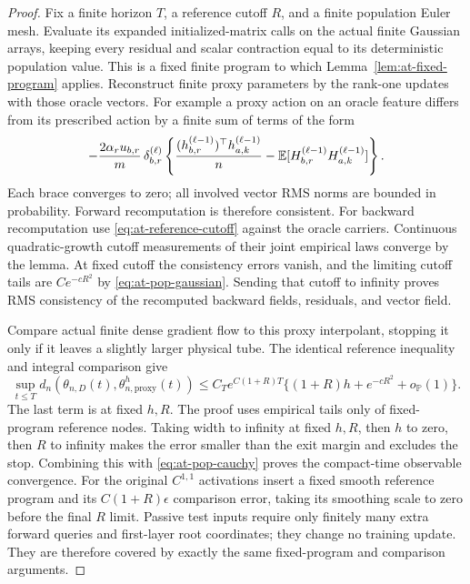 \begin{proof}
Fix a finite horizon $T$, a reference cutoff $R$, and a finite population
Euler mesh.  Evaluate its expanded initialized-matrix calls on the actual
finite Gaussian arrays, keeping every residual and scalar contraction
equal to its deterministic population value.  This is a fixed finite
program to which Lemma~\ref{lem:at-fixed-program} applies.
Reconstruct finite proxy parameters by the rank-one updates with those
oracle vectors.  For example a proxy action on an oracle feature differs
from its prescribed action by a finite sum of terms of the form
\[
 -\frac{2\alpha_ru_{b,r}}m\,\delta_{b,r}^{(\ell)}
 \left\{\frac{(h_{b,r}^{(\ell-1)})^\top h_{a,k}^{(\ell-1)}}n
              -\mathbb{E}[H_{b,r}^{(\ell-1)}H_{a,k}^{(\ell-1)}]\right\}.
\]
Each brace converges to zero; all involved vector RMS norms are bounded
in probability.  Forward recomputation is therefore consistent.
For backward recomputation use \eqref{eq:at-reference-cutoff} against
the oracle carriers.  Continuous quadratic-growth cutoff measurements
of their joint empirical laws converge by the lemma.  At fixed cutoff
the consistency errors vanish, and the limiting cutoff tails are
$Ce^{-cR^2}$ by \eqref{eq:at-pop-gaussian}.  Sending that cutoff to
infinity proves RMS consistency of the recomputed backward fields,
residuals, and vector field.

Compare actual finite dense gradient flow to this proxy interpolant,
stopping it only if it leaves a slightly larger physical tube.
The identical reference inequality and integral comparison give
\[
 \sup_{t\le T}d_n(\theta_{n,D}(t),\theta_{n,\mathrm{proxy}}^h(t))
 \le C_Te^{C(1+R)T}
       \{(1+R)h+e^{-cR^2}+o_{\mathbb P}(1)\}.
\]
The last term is at fixed $h,R$.  The proof uses empirical tails only
of fixed-program reference nodes.  Taking width to infinity at fixed
$h,R$, then $h$ to zero, then $R$ to infinity makes the error smaller
than the exit margin and excludes the stop.  Combining this with
\eqref{eq:at-pop-cauchy} proves the compact-time observable convergence.
For the original $C^{1,1}$ activations insert a fixed smooth reference
program and its $C(1+R)\epsilon$ comparison error, taking its smoothing
scale to zero before the final $R$ limit.  Passive test inputs require
only finitely many extra forward queries and first-layer root coordinates;
they change no training update.  They are therefore covered by exactly
the same fixed-program and comparison arguments.


\end{proof}
